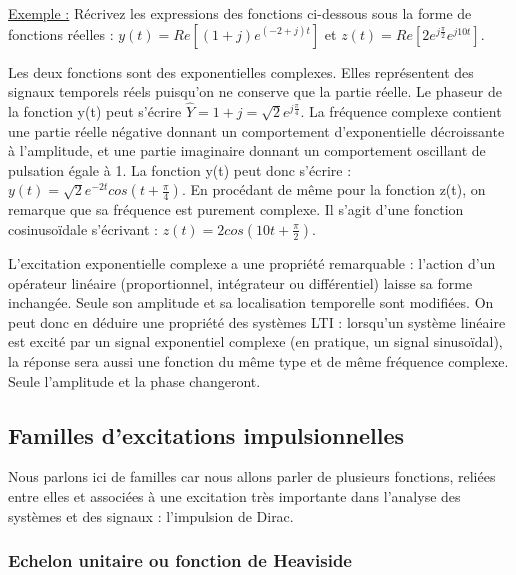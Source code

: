 \documentclass[]{book}
\begin{document}
{	\vspace{0.5\baselineskip}
	\underline{Exemple :}
	Récrivez les expressions des fonctions ci-dessous sous la forme de fonctions réelles : $y(t)=Re[(1+j)e^{(-2+j)t}]$ et $z(t) = Re[2e^{j\frac{\pi}{2}}e^{j10t}]$.
	
	Les deux fonctions sont des exponentielles complexes. Elles représentent des signaux temporels réels puisqu'on ne conserve que la partie réelle. Le phaseur de la fonction y(t) peut s'écrire $\hat{Y}=1+j=\sqrt{2}e^{j\frac{\pi}{4}}$. La fréquence complexe contient une partie réelle négative donnant un comportement d'exponentielle décroissante à l'amplitude, et une partie imaginaire donnant un comportement oscillant de pulsation égale à 1. La fonction y(t) peut donc s'écrire : $y(t)=\sqrt{2}e^{-2t}cos(t+\frac{\pi}{4})$.
	En procédant de même pour la fonction z(t), on remarque que sa fréquence est purement complexe. Il s'agit d'une fonction cosinusoïdale s'écrivant : $z(t)=2cos(10t+\frac{\pi}{2})$.
	
	\vspace{0.5\baselineskip}
	
	
	L'excitation exponentielle complexe a une propriété remarquable : l'action d'un opérateur linéaire (proportionnel, intégrateur ou différentiel) laisse sa forme inchangée. Seule son amplitude et sa localisation temporelle sont modifiées. On peut donc en déduire une propriété des systèmes LTI : lorsqu'un système linéaire est excité par un signal exponentiel complexe (en pratique, un signal sinusoïdal), la réponse sera aussi une fonction du même type et de même fréquence complexe. Seule l'amplitude et la phase changeront.
	
	
	
	\subsection{Familles d'excitations impulsionnelles}
	
	Nous parlons ici de familles car nous allons parler de plusieurs
	fonctions, reliées entre elles et associées à une excitation très importante
	dans l'analyse des systèmes et des signaux : l'impulsion de Dirac.
	
	\subsubsection{Echelon unitaire ou fonction de Heaviside}
	
}
\end{document}
